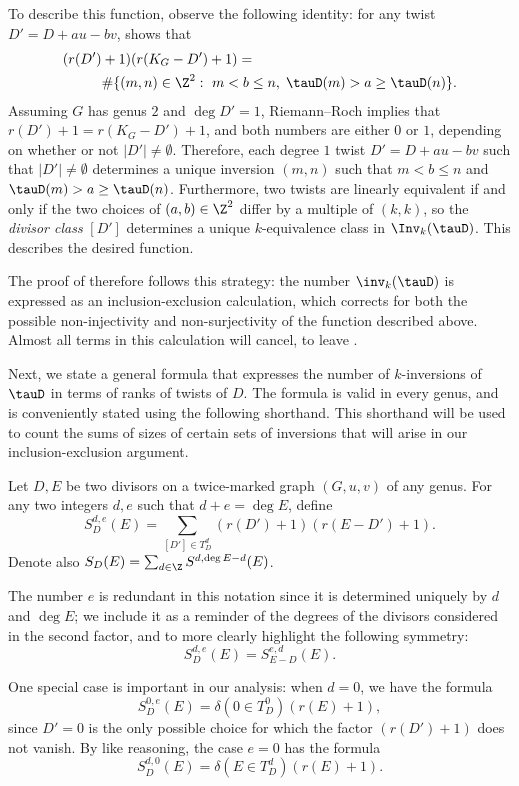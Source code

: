 To describe this function, observe the following identity: for any twist $D' = D + au-bv$,  shows that
\begin{align*}
( r(D') &+ 1 ) ( r(K_G-D') + 1 ) =\\
&\# \{ (m,n) \in \Z^2:\ m < b \leq n,\;\tauD(m) > a \geq \tauD(n) \}.
\end{align*}
Assuming $G$ has genus $2$ and $\deg D' = 1$, Riemann--Roch implies that $r(D') +1= r(K_G-D')+1$, and both numbers are either $0$ or $1$, depending on whether or not $|D'| \neq \emptyset$. Therefore, each degree $1$ twist $D' = D + au-bv$ such that $|D'| \neq \emptyset$ determines a unique inversion $(m,n)$ such that $m < b \leq n$ and $\tauD(m) > a \geq \tauD(n)$. Furthermore, two twists are linearly equivalent if and only if the two choices of $(a,b) \in \Z^2$ differ by a multiple of $(k,k)$, so the \emph{divisor class} $[D']$ determines a unique $k$-equivalence class in $\Inv_k(\tauD)$. This describes the desired function.

The proof of  therefore follows this strategy: the number $\inv_k(\tauD)$ is expressed as an inclusion-exclusion calculation, which corrects for both the possible non-injectivity and non-surjectivity of the function described above. Almost all terms in this calculation will cancel, to leave .

Next, we state a general formula that expresses the number of $k$-inversions of $\tauD$ in terms of ranks of twists of $D$. The formula is valid in every genus, and is conveniently stated using the following shorthand. This shorthand will be used to count the sums of sizes of certain sets of inversions that will arise in our inclusion-exclusion argument.

\begin{defi}
Let $D,E$ be two divisors on a twice-marked graph $(G,u,v)$ of any genus. For any two integers $d,e$ such that $d+e = \deg E$, define 
$$S^{d,e}_D(E) = \sum_{[D'] \in T^d_D} \left( r(D') + 1 \right) \left( r(E-D') + 1\right).$$
Denote also $S_D(E) = \sum_{d \in \Z} S^{d,\deg E - d}(E)$.
\end{defi}

The number $e$ is redundant in this notation since it is determined uniquely by $d$ and $\deg E$; we include it as a reminder of the degrees of the divisors considered in the second factor, and to more clearly highlight the following symmetry:
$$S^{d,e}_D(E) = S^{e,d}_{E-D}(E).$$

One special case is important in our analysis: when $d=0$, we have the formula
\begin{equation}
\label{eq:S0e}
S^{0,e}_D(E) = \delta(0 \in T^0_D) \left( r(E) + 1 \right),
\end{equation}
since $D' = 0$ is the only possible choice for which the factor $(r(D')+1)$ does not vanish. By like reasoning, the case $e=0$ has the formula
\begin{equation}
\label{eq:Sd0}
S^{d,0}_D(E) = \delta(E \in T^d_D) \left( r(E) + 1 \right).
\end{equation}

